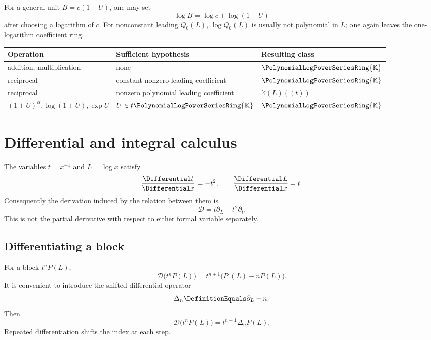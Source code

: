 \documentclass[11pt]{article}
\theoremstyle{pltheorem}
\newcommand{\K}{\mathbb K}
\newcommand{\PL}{\PolynomialLogPowerSeriesRing{\K}}
\newcommand{\D}{\mathcal D}
\begin{document}
For a general unit \(B=c(1+U)\), one may set
\[
 \log B=\log c+\log(1+U)
\]
after choosing a logarithm of \(c\).  For nonconstant leading \(Q_0(L)\), \(\log Q_0(L)\) is usually not polynomial in \(L\); one again leaves the one-logarithm coefficient ring.

\begin{keybox}
\begin{center}
\begin{tabular}{@{}lll@{}}
\toprule
Operation & Sufficient hypothesis & Resulting class\\
\midrule
addition, multiplication & none & \(\PL\)\\
reciprocal & constant nonzero leading coefficient & \(\PL\)\\
reciprocal & nonzero polynomial leading coefficient & \(\K(L)((t))\)\\
\((1+U)^\alpha,\log(1+U),\exp U\) & \(U\in t\PL\) & \(\PL\)\\
\bottomrule
\end{tabular}
\end{center}
\end{keybox}

\section{Differential and integral calculus}
\label{sec:differential-calculus}

The variables \(t=x^{-1}\) and \(L=\log x\) satisfy
\begin{equation}\label{eq:t-L-derivatives}
 \frac{\Differential t}{\Differential x}=-t^2,
 \qquad
 \frac{\Differential L}{\Differential x}=t.
\end{equation}
Consequently the derivation induced by the relation between them is
\begin{equation}\label{eq:D-operator}
 \D=t\partial_L-t^2\partial_t.
\end{equation}
This is not the partial derivative with respect to either formal variable separately.

\subsection{Differentiating a block}

For a block \(t^nP(L)\),
\begin{equation}\label{eq:block-derivative}
 \D\bigl(t^nP(L)\bigr)
 =t^{n+1}\bigl(P'(L)-nP(L)\bigr).
\end{equation}
It is convenient to introduce the shifted differential operator
\begin{equation}\label{eq:Delta-n}
 \Delta_n\DefinitionEquals\partial_L-n.
\end{equation}
Then
\begin{equation}\label{eq:block-derivative-Delta}
 \D\bigl(t^nP(L)\bigr)=t^{n+1}\Delta_nP(L).
\end{equation}
Repeated differentiation shifts the index at each step.
\end{document}
